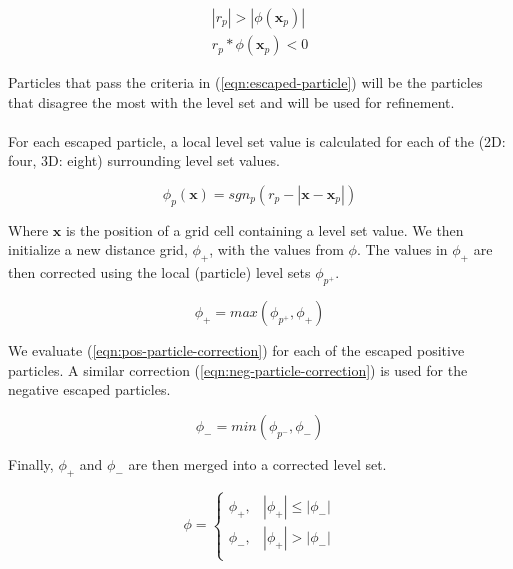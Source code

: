\documentclass[twocolumn]{article}
\begin{document}
\begin{equation}
\begin{split}
    |r_{p}| > |\phi(\mathbf{x}_p)| \\
    r_{p}*\phi(\mathbf{x}_p) < 0
\label{eqn:escaped-particle}
\end{split}
\end{equation}

Particles that pass the criteria in (\ref{eqn:escaped-particle}) will be the particles that disagree the most with the level set and will be used for refinement.
\\\\
For each escaped particle, a local level set value is calculated for each of the (2D: four, 3D: eight) surrounding level set values.

\begin{equation}
  \phi_p(\mathbf{x}) = sgn_p(r_p - |\mathbf{x} - \mathbf{x}_p|)
\label{eqn:particle-level-set}
\end{equation}

Where $\mathbf{x}$ is the position of a grid cell containing a level set value. We then initialize a new distance grid, $\phi_+$, with the values from $\phi$. The values in $\phi_+$ are then corrected using the local (particle) level sets $\phi_{p^+}$.

\begin{equation}
  \phi_+ = max(\phi_{p^+}, \phi_+)
\label{eqn:pos-particle-correction}
\end{equation}

We evaluate (\ref{eqn:pos-particle-correction}) for each of the escaped positive particles. A similar correction (\ref{eqn:neg-particle-correction}) is used for the negative escaped particles.

\begin{equation}
  \phi_- = min(\phi_{p^-}, \phi_-)
\label{eqn:neg-particle-correction}
\end{equation}

Finally, $\phi_+$ and $\phi_-$ are then merged into a corrected level set.

\begin{equation}
  \phi = \begin{cases}
    \phi_+, & |\phi_+| \le |\phi_-| \\
                \phi_-, & |\phi_+| > |\phi_-| \\
                \end{cases}
\label{eqn:pls-merge}
\end{equation}
\end{document}
